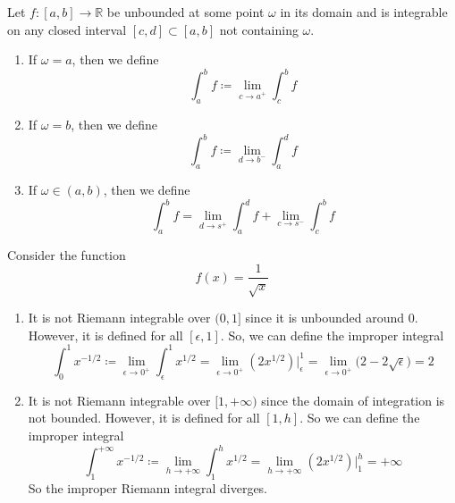   \begin{definition}
    \label{def:improper-integral-of-unbounded-function}
    Let $f: [a, b] \to \mathbb{R}$ be unbounded at some point $\omega$ in its domain and is integrable on any closed interval $[c, d] \subset [a, b]$ not containing $\omega$. 
    \begin{enumerate}
      \item If $\omega = a$, then we define 
        \begin{equation}
          \int_a^b f \coloneqq \lim_{c \rightarrow a^+} \int_c^b f
        \end{equation}

      \item If $\omega = b$, then we define 
        \begin{equation}
          \int_a^b f \coloneqq \lim_{d \rightarrow b^-} \int_a^d f
        \end{equation}

      \item If $\omega \in (a, b)$, then we define 
        \begin{equation}
          \int_a^b f = \lim_{d \to s^+} \int_a^d f + \lim_{c \to s^-}\int_c^b f 
        \end{equation}
    \end{enumerate}
  \end{definition}

  \begin{example}
    \label{ex:improper-integral-of-1sqrtx}
    Consider the function 
    \begin{equation}
      f(x) = \frac{1}{\sqrt{x}}
    \end{equation}
    \begin{enumerate}
      \item It is not Riemann integrable over $(0, 1]$ since it is unbounded around $0$. However, it is defined for all $[\epsilon, 1]$. So, we can define the improper integral
        \begin{equation}
          \int_0^1 x^{-1/2} \coloneqq \lim_{\epsilon \to 0^+} \int_\epsilon^1 x^{1/2} = \lim_{\epsilon \to 0^+} (2 x^{1/2}) \big|_\epsilon^1 = \lim_{\epsilon \to 0^+} \big( 2 - 2\sqrt{\epsilon}) = 2
        \end{equation}
      \item It is not Riemann integrable over $[1, +\infty)$ since the domain of integration is not bounded. However, it is defined for all $[1, h]$. So we can define the improper integral 
        \begin{equation}
          \int_1^{+\infty} x^{-1/2} \coloneqq \lim_{h \to +\infty} \int_1^h x^{1/2} = \lim_{h \to +\infty} (2 x^{1/2}) \big|_1^{h} = +\infty
        \end{equation}
        So the improper Riemann integral diverges. 
    \end{enumerate}
  \end{example}

